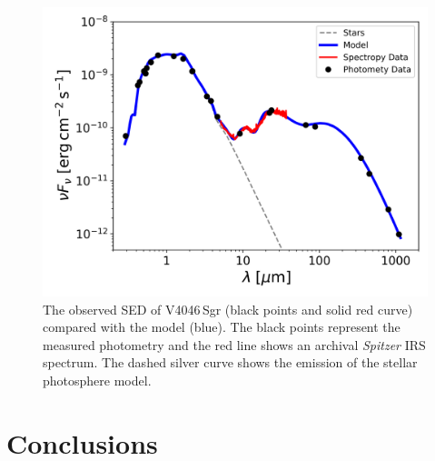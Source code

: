 \documentclass[letters,usenatbib,times]{mnras}
\begin{document}
\begin{figure}
	\centering
	\includegraphics[width=\columnwidth]{SED_.png}
    \caption{The observed SED of V4046\,Sgr  (black points and solid red curve) compared with the model (blue). The black points represent the measured photometry and the red line shows an archival \textit{Spitzer} IRS spectrum. The dashed silver curve shows the emission of the stellar photosphere model.}
    \label{fig:SED}
\end{figure}

\section{Conclusions} \label{sec:Conclusions}
\end{document}
